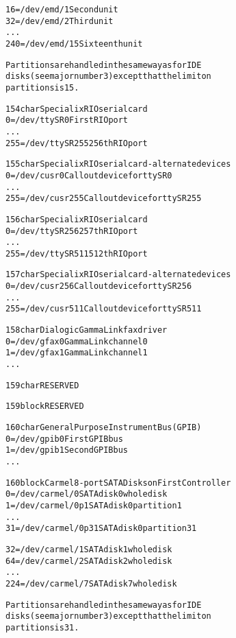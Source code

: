 \documentclass[a4paper,8pt,english]{sphinxmanual}
\begin{document}
\begin{alltt}
                 16 = /dev/emd/1        Second unit
                 32 = /dev/emd/2        Third unit
                    ...
                240 = /dev/emd/15       Sixteenth unit

                Partitions are handled in the same way as for IDE
                disks (see major number 3) except that the limit on
                partitions is 15.

 154 char       Specialix RIO serial card
                  0 = /dev/ttySR0       First RIO port
                    ...
                255 = /dev/ttySR255     256th RIO port

 155 char       Specialix RIO serial card - alternate devices
                  0 = /dev/cusr0        Callout device for ttySR0
                    ...
                255 = /dev/cusr255      Callout device for ttySR255

 156 char       Specialix RIO serial card
                  0 = /dev/ttySR256     257th RIO port
                    ...
                255 = /dev/ttySR511     512th RIO port

 157 char       Specialix RIO serial card - alternate devices
                  0 = /dev/cusr256      Callout device for ttySR256
                    ...
                255 = /dev/cusr511      Callout device for ttySR511

 158 char       Dialogic GammaLink fax driver
                  0 = /dev/gfax0        GammaLink channel 0
                  1 = /dev/gfax1        GammaLink channel 1
                    ...

 159 char       RESERVED

 159 block      RESERVED

 160 char       General Purpose Instrument Bus (GPIB)
                  0 = /dev/gpib0        First GPIB bus
                  1 = /dev/gpib1        Second GPIB bus
                    ...

 160 block       Carmel 8-port SATA Disks on First Controller
                  0 = /dev/carmel/0     SATA disk 0 whole disk
                  1 = /dev/carmel/0p1   SATA disk 0 partition 1
                    ...
                 31 = /dev/carmel/0p31  SATA disk 0 partition 31

                 32 = /dev/carmel/1     SATA disk 1 whole disk
                 64 = /dev/carmel/2     SATA disk 2 whole disk
                    ...
                224 = /dev/carmel/7     SATA disk 7 whole disk

                Partitions are handled in the same way as for IDE
                disks (see major number 3) except that the limit on
                partitions is 31.


\end{alltt}
\end{document}
